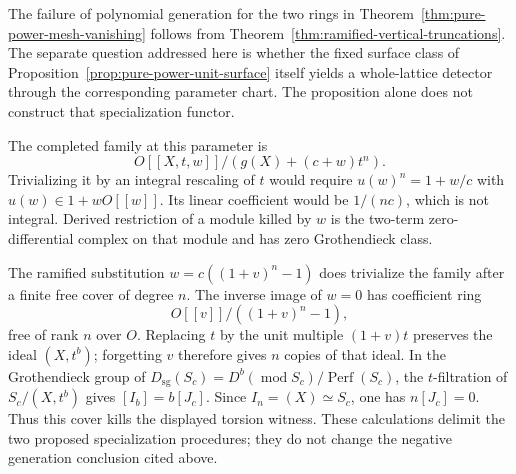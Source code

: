 \begin{remark}
\label{rem:pure-power-missing-specialization}
The failure of polynomial generation for the two rings in
Theorem~\ref{thm:pure-power-mesh-vanishing} follows from
Theorem~\ref{thm:ramified-vertical-truncations}.  The separate
question addressed here is whether the fixed surface class of
Proposition~\ref{prop:pure-power-unit-surface} itself yields a
whole-lattice detector through the corresponding parameter chart.
The proposition alone does not construct that specialization functor.

The completed family at this parameter is
\[
 O[[X,t,w]]/(g(X)+(c+w)t^n).
\]
Trivializing it by an integral rescaling of \(t\) would require
\(u(w)^n=1+w/c\) with \(u(w)\in1+wO[[w]]\).  Its linear
coefficient would be \(1/(nc)\), which is not integral.
Derived restriction of a module killed by \(w\) is the
two-term zero-differential complex on that module and has zero
Grothendieck class.

The ramified substitution \(w=c((1+v)^n-1)\) does trivialize the
family after a finite free cover of degree \(n\).  The inverse
image of \(w=0\) has coefficient ring
\[
 O[[v]]/((1+v)^n-1),
\]
free of rank \(n\) over \(O\).  Replacing \(t\) by the unit
multiple \((1+v)t\) preserves the ideal \((X,t^b)\); forgetting
\(v\) therefore gives \(n\) copies of that ideal.
In the Grothendieck group of
\(D_{\mathrm{sg}}(S_c)=D^b(\operatorname{mod}S_c)/
\operatorname{Perf}(S_c)\), the \(t\)-filtration of
\(S_c/(X,t^b)\) gives \([I_b]=b[J_c]\).
Since \(I_n=(X)\simeq S_c\), one has \(n[J_c]=0\).
Thus this cover kills the displayed torsion witness.  These
calculations delimit the two proposed specialization procedures;
they do not change the negative generation conclusion cited above.
\end{remark}
